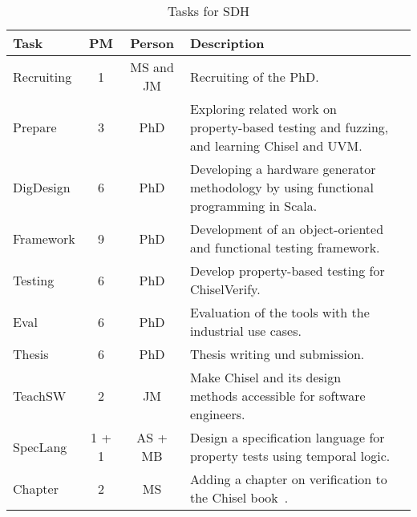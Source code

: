 \documentclass[fleqn,12pt]{article}
\begin{document}
\begin{table*}%
{\small
  \begin{center}
    \begin{tabular}{lccp{110mm}l}
      \toprule
      Task                   & PM  & Person    & Description                                                                                   \\
      \midrule
      Recruiting             & 1   & MS and JM & Recruiting of the PhD.                                                                    \\
      \midrule
      Prepare                & 3   & PhD      & Exploring related work on property-based testing and fuzzing, and learning Chisel and UVM.                           \\
      DigDesign               & 6   & PhD      & Developing a hardware generator methodology by using functional programming in Scala.         \\
      Framework              & 9   & PhD      & Development of an object-oriented and functional testing framework.                      \\
      Testing & 6   & PhD      & Develop property-based testing for ChiselVerify.                                                      \\
      Eval                   & 6 & PhD    & Evaluation of the tools with the industrial use cases.                                                     \\
      Thesis                 & 6   & PhD    & Thesis writing und submission.                                                                \\
      \midrule
      TeachSW                 &  2  & JM            & Make Chisel and its design methods accessible for software engineers. \\
      SpecLang                &    1 + 1   &  AS + MB & Design a specification language for property tests using temporal logic. \\
      Chapter                & 2   & MS        & Adding a chapter on verification to the Chisel book~\cite{chisel:book}.                       \\
      \bottomrule
    \end{tabular}
  \end{center}
  \caption{Tasks for SDH}\label{tab:packages}
}
\end{table*}
\end{document}

